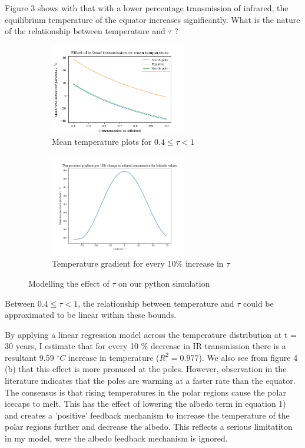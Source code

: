 \documentclass{article}%
\begin{document}
Figure 3 shows with that with a lower percentage transmission of infrared, the equilibrium temperature of the equator increases significantly. 
What is the nature of the relationship between temperature and $\tau$ ? 

\begin{figure}[H]%
  \centering%
  \begin{subfigure}{0.4\textwidth}
    \includegraphics[width=225px]{mean-temperature-IR.png}
    \caption{Mean temperature plots for $ 0.4 \le \tau < 1 $}
  \end{subfigure}
  \begin{subfigure}{0.4\textwidth}
    \includegraphics[width=225px]{Temperature-grad-tau.png}
    \caption{Temperature gradient for every 10$ \%$ increase in $ \tau$}
  \end{subfigure}
  \caption{Modelling the effect of $\tau$ on our python simulation}
\end{figure}

Between $ 0.4 \le \tau < 1 $, the relationship between temperature and $\tau$ could be approximated to be linear within these bounds.

By applying a linear regression model across the temperature distribution at t = 30 years, I estimate that for every 10 \% decrease in IR transmission 
there is a resultant 9.59 $^\circ C$ increase in temperature ($ R^2 = 0.977$). We also see from figure 4 (b) that this effect is more pronuced at the poles. 
However, observation in the literature indicates that the poles are warming at a faster rate than the equator. 
The consensus is that rising temperatures in the polar regions cause the polar icecaps to melt. This has the effect of lowering the albedo term in equation 1)
and creates a 'positive' feedback mechanism to increase the temperature of the polar regions further and decrease the albedo. \cite{NASA}
 This reflects a serious limitatiton in my model, were the albedo feedback mechanism is ignored.
\end{document}
